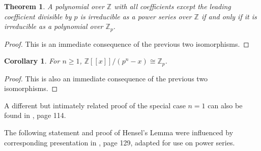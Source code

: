 \documentclass{article}
\newtheorem{theorem}{Theorem}
\newtheorem{corollary}{Corollary}
\begin{document}
\begin{theorem}
A polynomial over $\mathbb{Z}$ with all coefficients except the leading coefficient divisible by $p$ is irreducible as a power series over $\mathbb{Z}$ if and only if it is irreducible as a polynomial over $\mathbb{Z}_p$.
\end{theorem}
\begin{proof}
This is an immediate consequence of the previous two isomorphisms.
\end{proof}

\begin{corollary}\label{zp}
For $n \ge 1$, $\mathbb{Z}[[x]]/(p^n-x) \cong \mathbb{Z}_p$.
\end{corollary}
\begin{proof}
This is also an immediate consequence of the previous two isomorphisms.
\end{proof}

A different but intimately related proof of the special case $n=1$ can also be found in \cite{MR1697859}, page 114.

The following statement and proof of Hensel's Lemma were influenced by corresponding presentation in  \cite{MR1697859}, page 129, adapted for use on power series.
\end{document}
